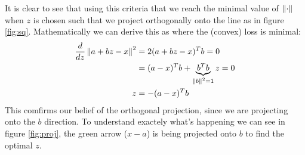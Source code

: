 			It is clear to see that using this criteria that we reach the minimal value of $\left\lVert\cdot\right\rVert$ when $z$ is chosen such that we project orthogonally onto the line as in figure \ref{fig:sq}. Mathematically we can derive this as where the (convex) loss is minimal:
			\begin{equation}
			\label{eq:sol_z}
				\begin{split}
					\frac{d}{d z}\left\lVert a + bz - x\right\rVert^2 &= 2(a +bz - x)^T b = 0 \\
					  &=(a-x)^T b + \underbrace{b^Tb }_{\left\lVert b\right\rVert^2 = 1}z = 0\\
					z &=-(a-x)^Tb
				\end{split}
			\end{equation}
			This comfirms our belief of the orthogonal projection, since we are projecting onto the $b$ direction. To understand exactely what's happening we can see in figure \ref{fig:proj}, the green arrow ($x-a$) is being projected onto $b$ to find the optimal $z$.
			\pagebreak
			
